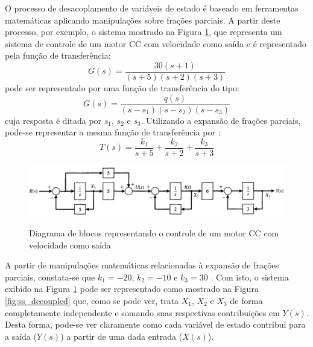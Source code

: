 O processo de desacoplamento de variáveis de estado é baseado em ferramentas matemáticas aplicando manipulações sobre frações parciais. A partir deste processo, por exemplo, o sistema mostrado na Figura \ref{fig:ss_coupled}, que representa um sistema de controle de um motor CC com velocidade como saída e é representado pela função de transferência:
\begin{equation}
G(s)=\frac{30(s+1)}{(s+5)(s+2)(s+3)}
\end{equation}
pode ser representado por uma função de transferência do tipo:
\begin{equation}
G(s)=\frac{q(s)}{(s-s_1)(s-s_2)(s-s_3)}
\end{equation}
cuja resposta é ditada por $s_1$, $s_2$ e $s_3$. Utilizando a expansão de frações parciais, pode-se representar a mesma função de transferência por \cite[p.~183]{Dorf2011}:
\begin{equation}
T(s)=\frac{k_1}{s+5}+\frac{k_2}{s+2}+\frac{k_3}{s+3}
\end{equation}

\begin{figure}[!htb]
    \centering
    \caption{Diagrama de blocos representando o controle de um motor CC com velocidade como saída}
    \includegraphics[width=1\textwidth]{./04-figuras/fund_teorica/ss_coupled_blocks}
    \label{fig:ss_coupled}
\end{figure}

A partir de manipulações matemáticas relacionadas à expansão de frações parciais, constata-se que $k_1=-20$, $k_2=-10$ e $k_3=30$ \cite[p.~182]{Dorf2011}. Com isto, o sistema exibido na Figura \ref{fig:ss_coupled} pode ser representado como mostrado na Figura \ref{fig:ss_decoupled} que, como se pode ver, trata $X_1$, $X_2$ e $X_3$ de forma completamente independente e somando suas respectivas contribuições em $Y(s)$. Desta forma, pode-se ver claramente como cada variável de estado contribui para a saída ($Y(s)$) a partir de uma dada entrada ($X(s)$).

